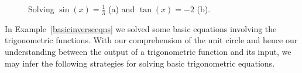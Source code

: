\begin{example}
	\begin{figure}[H]
		\centering
		\centerline{
			\hspace{0.1cm}
		}
		\caption{Solving $\sin(x) = \frac{1}{3}$ (a) and  $\tan(x)=-2$ (b).}
	\end{figure}
	
	
\end{example}


In Example~\ref{basicinverseeqns} we solved some basic equations involving the trigonometric functions.
\fi With our comprehension of the unit circle and hence our understanding between the output of a trigonometric function and its input, we may infer the following strategies for solving  basic trigonometric equations.

